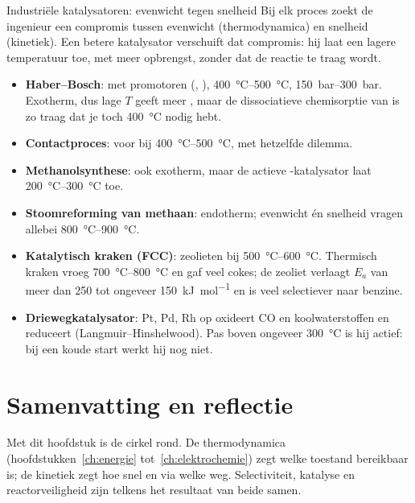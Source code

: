 \begin{toepassing}{Industri\"ele katalysatoren: evenwicht tegen snelheid}
Bij elk proces zoekt de ingenieur een compromis tussen evenwicht (thermodynamica) en snelheid (kinetiek). Een betere katalysator verschuift dat compromis: hij laat een lagere temperatuur toe, met meer opbrengst, zonder dat de reactie te traag wordt.
\begin{itemize}
\item \textbf{Haber--Bosch}:  met promotoren (, ), \SIrange{400}{500}{\celsius}, \SIrange{150}{300}{\bar}. Exotherm, dus lage $T$ geeft meer , maar de dissociatieve chemisorptie van  is zo traag dat je toch \SI{400}{\celsius} nodig hebt.
\item \textbf{Contactproces}:  voor  bij \SIrange{400}{500}{\celsius}, met hetzelfde dilemma.
\item \textbf{Methanolsynthese}: ook exotherm, maar de actieve -katalysator laat \SIrange{200}{300}{\celsius} toe.
\item \textbf{Stoomreforming van methaan}: endotherm; evenwicht \'en snelheid vragen allebei \SIrange{800}{900}{\celsius}.
\item \textbf{Katalytisch kraken (FCC)}: zeolieten bij \SIrange{500}{600}{\celsius}. Thermisch kraken vroeg \SIrange{700}{800}{\celsius} en gaf veel cokes; de zeoliet verlaagt $E_a$ van meer dan \SI{250}{} tot ongeveer \SI{150}{\kilo\joule\per\mole} en is veel selectiever naar benzine.
\item \textbf{Driewegkatalysator}: Pt, Pd, Rh op  oxideert CO en koolwaterstoffen en reduceert  (Langmuir--Hinshelwood). Pas boven ongeveer \SI{300}{\celsius} is hij actief: bij een koude start werkt hij nog niet.
\end{itemize}
\end{toepassing}

\section{Samenvatting en reflectie}

Met dit hoofdstuk is de cirkel rond. De thermodynamica (hoofdstukken~\ref{ch:energie} tot~\ref{ch:elektrochemie}) zegt welke toestand bereikbaar is; de kinetiek zegt hoe snel en via welke weg. Selectiviteit, katalyse en reactorveiligheid zijn telkens het resultaat van beide samen.

